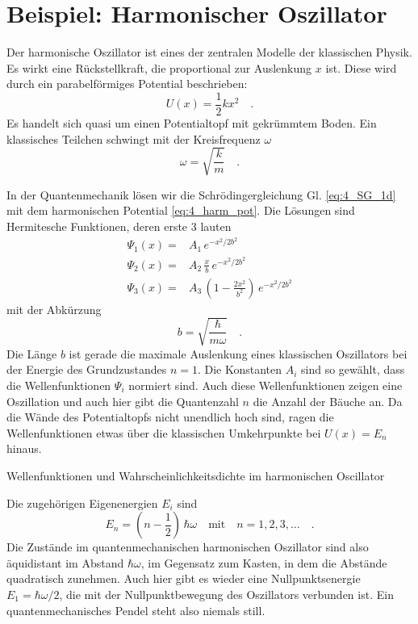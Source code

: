 \section{Beispiel: Harmonischer Oszillator}

Der harmonische Oszillator ist eines der zentralen Modelle der klassischen Physik. Es wirkt eine Rückstellkraft, die proportional zur Auslenkung $x$ ist. Diese wird durch ein parabelförmiges Potential beschrieben:
\begin{equation}
    U(x) = \frac{1}{2} k x^2 \quad .
    \label{eq:4_harm_pot}
\end{equation}
Es handelt sich quasi um einen Potentialtopf mit gekrümmtem Boden.
Ein klassisches Teilchen schwingt mit der Kreisfrequenz $\omega$
\begin{equation}
    \omega = \sqrt{\frac{k}{m}} \quad .
\end{equation}

In der Quantenmechanik lösen wir die Schrödingergleichung Gl. \ref{eq:4_SG_1d} mit dem harmonischen Potential \ref{eq:4_harm_pot}. Die Lösungen sind Hermitesche Funktionen, deren erste 3 lauten
\begin{align}
    \Psi_1(x) = & A_1 \, e^{-x^2 / 2 b^2} \\
    \Psi_2(x) = & A_2 \, \frac{x}{b} \, e^{-x^2 / 2 b^2} \\
    \Psi_3(x) = & A_3 \, \left(1- \frac{2x^2}{b^2} \right) \, e^{-x^2 / 2 b^2} 
\end{align}
mit der Abkürzung 
\begin{equation}
    b = \sqrt{\frac{\hbar}{m \omega}} \quad .
\end{equation}
Die Länge $b$ ist gerade die maximale Auslenkung eines klassischen Oszillators bei der Energie des Grundzustandes $n=1$. Die Konstanten $A_i$ sind so gewählt, dass die Wellenfunktionen $\Psi_i$ normiert sind. Auch diese Wellenfunktionen zeigen eine Oszillation und auch hier gibt die Quantenzahl $n$ die Anzahl der Bäuche an. Da die Wände des Potentialtopfs nicht unendlich hoch sind, ragen die Wellenfunktionen etwas über die klassischen Umkehrpunkte bei $U(x) = E_n$ hinaus.

\begin{marginfigure}
    \caption{Wellenfunktionen und Wahrscheinlichkeitsdichte im harmonischen Oscillator}
\end{marginfigure}

Die zugehörigen Eigenenergien $E_i$ sind
\begin{equation}
    E_n = \left( n - \frac{1}{2}\right) \, \hbar \omega \quad \text{mit} \quad n = 1, 2, 3, \dots \quad .
\end{equation}
Die Zustände im quantenmechanischen harmonischen Oszillator sind also äquidistant im Abstand $\hbar\omega$, im Gegensatz zum Kasten, in dem die Abstände quadratisch zunehmen. Auch hier gibt es wieder eine Nullpunktsenergie $E_1 = \hbar\omega/2$, die mit der Nullpunktbewegung des Oszillators verbunden ist. Ein quantenmechanisches Pendel steht also niemals still.

